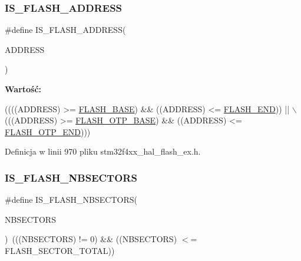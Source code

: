 \subsubsection{\texorpdfstring{I\+S\+\_\+\+F\+L\+A\+S\+H\+\_\+\+A\+D\+D\+R\+E\+SS}{IS\_FLASH\_ADDRESS}}
{\footnotesize\ttfamily \#define I\+S\+\_\+\+F\+L\+A\+S\+H\+\_\+\+A\+D\+D\+R\+E\+SS(\begin{DoxyParamCaption}\item[{}]{A\+D\+D\+R\+E\+SS }\end{DoxyParamCaption})}

{\bfseries Wartość\+:}
\begin{DoxyCode}
((((ADDRESS) >= \hyperlink{group___peripheral__memory__map_ga23a9099a5f8fc9c6e253c0eecb2be8db}{FLASH\_BASE}) && ((ADDRESS) <= \hyperlink{group___peripheral__memory__map_ga8be554f354e5aa65370f6db63d4f3ee4}{FLASH\_END})) || \(\backslash\)
                                   (((ADDRESS) >= \hyperlink{group___peripheral__memory__map_ga91d296a67aec0da8f31c368cbc0eea94}{FLASH\_OTP\_BASE}) && ((ADDRESS) <= 
      \hyperlink{group___peripheral__memory__map_ga5bec9c5a91e312fca36f256f508ceee1}{FLASH\_OTP\_END})))
\end{DoxyCode}


Definicja w linii 970 pliku stm32f4xx\+\_\+hal\+\_\+flash\+\_\+ex.\+h.

\mbox{\label{group___f_l_a_s_h_ex___i_s___f_l_a_s_h___definitions_ga5b85e63e0066bf7ca518cb3790ad67e0}} 
\subsubsection{\texorpdfstring{I\+S\+\_\+\+F\+L\+A\+S\+H\+\_\+\+N\+B\+S\+E\+C\+T\+O\+RS}{IS\_FLASH\_NBSECTORS}}
{\footnotesize\ttfamily \#define I\+S\+\_\+\+F\+L\+A\+S\+H\+\_\+\+N\+B\+S\+E\+C\+T\+O\+RS(\begin{DoxyParamCaption}\item[{}]{N\+B\+S\+E\+C\+T\+O\+RS }\end{DoxyParamCaption})~(((N\+B\+S\+E\+C\+T\+O\+RS) != 0) \&\& ((N\+B\+S\+E\+C\+T\+O\+RS) $<$= F\+L\+A\+S\+H\+\_\+\+S\+E\+C\+T\+O\+R\+\_\+\+T\+O\+T\+AL))}



